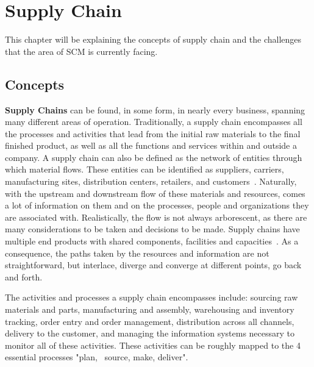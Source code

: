 \chapter{Supply Chain}
\label{chap:supply-chain-problems}

\minitoc \mtcskip \noindent

This chapter will be explaining the concepts of supply chain and the challenges that the area of SCM is currently facing.

\section{Concepts}
\textbf{Supply Chains} can be found, in some form, in nearly every business, spanning many different areas of operation. Traditionally, a supply chain encompasses all the processes and activities that lead from the initial raw materials to the final finished product, as well as all the functions and services within and outside a company. A supply chain can also be defined as the network of entities through which material flows. These entities can be identified as suppliers, carriers, manufacturing sites, distribution centers, retailers, and customers~\cite{Lummus2014}. Naturally, with the upstream and downstream flow of these materials and resources, comes a lot of information on them and on the processes, people and organizations they are associated with. Realistically, the  flow is not always arborescent, as there are many considerations to be taken and decisions to be made. Supply chains have multiple end products with shared components, facilities and capacities~\cite{Ganeshan1995}. As a consequence, the paths taken by the resources and information are not straightforward, but interlace, diverge and converge at different points, go back and forth.
  
  
  The activities and processes a supply chain encompasses include: sourcing raw materials and parts, manufacturing and assembly, warehousing and inventory tracking, order entry and order management, distribution across all channels, delivery to the customer, and managing the information systems necessary to monitor all of these activities. These activities can be roughly mapped to the 4 essential processes "plan,~ source, make, deliver".~\cite{Lummus2014}
  
  
